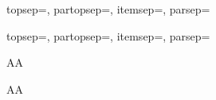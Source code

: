 ﻿\documentclass{article}
\newcommand{\printverticalvalues}{
        topsep=\the\topsep, 
        partopsep=\the\partopsep, 
        itemsep=\the\itemsep, 
        parsep=\the\parsep
    }
\begin{document}
    \begin{mylist3b}
        \item \printverticalvalues
        \begin{mylist3b}
            \item \printverticalvalues
        \end{mylist3b}
    \end{mylist3b}

\hrulefill\par\hrulefill

    \begin{mylist4}
        \item AA
        \begin{mylist4}
            \item AA
        \end{mylist4}
    \end{mylist4}
\end{document}
